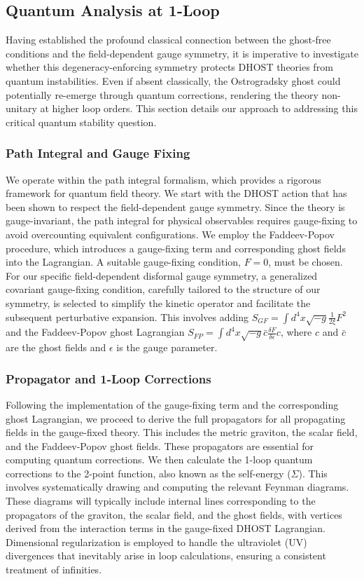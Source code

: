 \documentclass[twocolumn]{aastex631}
\begin{document}
\subsection{Quantum Analysis at 1-Loop}

Having established the profound classical connection between the ghost-free conditions and the field-dependent gauge symmetry, it is imperative to investigate whether this degeneracy-enforcing symmetry protects DHOST theories from quantum instabilities. Even if absent classically, the Ostrogradsky ghost could potentially re-emerge through quantum corrections, rendering the theory non-unitary at higher loop orders. This section details our approach to addressing this critical quantum stability question.

\subsubsection{Path Integral and Gauge Fixing}
We operate within the path integral formalism, which provides a rigorous framework for quantum field theory. We start with the DHOST action that has been shown to respect the field-dependent gauge symmetry. Since the theory is gauge-invariant, the path integral for physical observables requires gauge-fixing to avoid overcounting equivalent configurations. We employ the Faddeev-Popov procedure, which introduces a gauge-fixing term and corresponding ghost fields into the Lagrangian. A suitable gauge-fixing condition, $F=0$, must be chosen. For our specific field-dependent disformal gauge symmetry, a generalized covariant gauge-fixing condition, carefully tailored to the structure of our symmetry, is selected to simplify the kinetic operator and facilitate the subsequent perturbative expansion. This involves adding $S_{GF} = \int d^4x \sqrt{-g} \frac{1}{2\xi} F^2$ and the Faddeev-Popov ghost Lagrangian $S_{FP} = \int d^4x \sqrt{-g} \bar{c} \frac{\delta F}{\delta \epsilon} c$, where $c$ and $\bar{c}$ are the ghost fields and $\epsilon$ is the gauge parameter.

\subsubsection{Propagator and 1-Loop Corrections}
Following the implementation of the gauge-fixing term and the corresponding ghost Lagrangian, we proceed to derive the full propagators for all propagating fields in the gauge-fixed theory. This includes the metric graviton, the scalar field, and the Faddeev-Popov ghost fields. These propagators are essential for computing quantum corrections. We then calculate the 1-loop quantum corrections to the 2-point function, also known as the self-energy ($\Sigma$). This involves systematically drawing and computing the relevant Feynman diagrams. These diagrams will typically include internal lines corresponding to the propagators of the graviton, the scalar field, and the ghost fields, with vertices derived from the interaction terms in the gauge-fixed DHOST Lagrangian. Dimensional regularization is employed to handle the ultraviolet (UV) divergences that inevitably arise in loop calculations, ensuring a consistent treatment of infinities.
\end{document}
